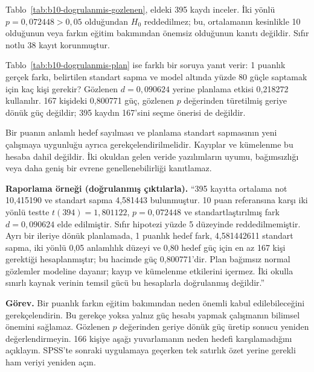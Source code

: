 \begin{outputguidebox}
Tablo~\ref{tab:b10-dogrulanmis-gozlenen}, eldeki 395 kaydı inceler.
İki yönlü $p=0{,}072448>0{,}05$ olduğundan $H_0$ reddedilmez;
bu, ortalamanın kesinlikle 10 olduğunun veya farkın eğitim bakımından
önemsiz olduğunun kanıtı değildir. Sıfır notlu 38 kayıt korunmuştur.

Tablo~\ref{tab:b10-dogrulanmis-plan} ise farklı bir soruya yanıt
verir: 1 puanlık gerçek farkı, belirtilen standart sapma ve model
altında yüzde 80 güçle saptamak için kaç kişi gerekir?
Gözlenen $d=0{,}090624$ yerine planlama etkisi 0,218272 kullanılır.
167 kişideki 0,800771 güç, gözlenen $p$ değerinden türetilmiş
geriye dönük güç değildir; 395 kaydın 167'sini seçme önerisi de değildir.

Bir puanın anlamlı hedef sayılması ve planlama standart sapmasının
yeni çalışmaya uygunluğu ayrıca gerekçelendirilmelidir. Kayıplar ve
kümelenme bu hesaba dahil değildir. İki okuldan gelen veride yazılımların
uyumu, bağımsızlığı veya daha geniş bir evrene genellenebilirliği kanıtlamaz.
\end{outputguidebox}

\textbf{Raporlama örneği (doğrulanmış çıktılarla).}
``395 kayıtta ortalama not 10,415190 ve standart sapma 4,581443
bulunmuştur. 10 puan referansına karşı iki yönlü testte
$t(394)=1{,}801122$, $p=0{,}072448$ ve standartlaştırılmış fark
$d=0{,}090624$ elde edilmiştir. Sıfır hipotezi yüzde 5 düzeyinde
reddedilmemiştir. Ayrı bir ileriye dönük planlamada, 1 puanlık hedef
fark, 4,581442611 standart sapma, iki yönlü 0,05 anlamlılık düzeyi
ve 0,80 hedef güç için en az 167 kişi gerektiği hesaplanmıştır;
bu hacimde güç 0,800771'dir. Plan bağımsız normal gözlemler modeline
dayanır; kayıp ve kümelenme etkilerini içermez. İki okulla sınırlı
kaynak verinin temsil gücü bu hesaplarla doğrulanmış değildir.''


\textbf{Görev.} Bir puanlık farkın eğitim bakımından neden önemli kabul
edilebileceğini gerekçelendirin. Bu gerekçe yoksa yalnız güç hesabı yapmak
çalışmanın bilimsel önemini sağlamaz. Gözlenen $p$ değerinden geriye dönük
güç üretip sonucu yeniden değerlendirmeyin. 166 kişiye aşağı yuvarlamanın
neden hedefi karşılamadığını açıklayın. SPSS'te sonraki uygulamaya
geçerken tek satırlık özet yerine gerekli ham veriyi yeniden açın.